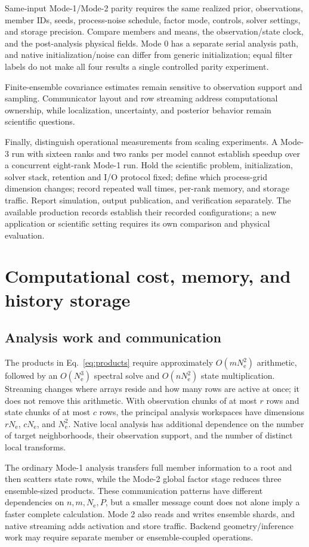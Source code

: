 \documentclass[11pt,a4paper]{article}
\newcommand{\Ne}{N_{\mathrm e}}
\begin{document}
Same-input Mode-1/Mode-2 parity requires the same realized prior, observations, member IDs, seeds, process-noise schedule, factor mode, controls, solver settings, and storage precision. Compare members and means, the observation/state clock, and the post-analysis physical fields. Mode 0 has a separate serial analysis path, and native initialization/noise can differ from generic initialization; equal filter labels do not make all four results a single controlled parity experiment.

Finite-ensemble covariance estimates remain sensitive to observation support and sampling. Communicator layout and row streaming address computational ownership, while localization, uncertainty, and posterior behavior remain scientific questions.

Finally, distinguish operational measurements from scaling experiments. A Mode-3 run with sixteen ranks and two ranks per model cannot establish speedup over a concurrent eight-rank Mode-1 run. Hold the scientific problem, initialization, solver stack, retention and I/O protocol fixed; define which process-grid dimension changes; record repeated wall times, per-rank memory, and storage traffic. Report simulation, output publication, and verification separately. The available production records establish their recorded configurations; a new application or scientific setting requires its own comparison and physical evaluation.


\section{Computational cost, memory, and history storage}
\subsection{Analysis work and communication}
The products in Eq.~\ref{eq:products} require approximately \(O(m\Ne^2)\) arithmetic, followed by an \(O(\Ne^3)\) spectral solve and \(O(n\Ne^2)\) state multiplication. Streaming changes where arrays reside and how many rows are active at once; it does not remove this arithmetic. With observation chunks of at most \(r\) rows and state chunks of at most \(c\) rows, the principal analysis workspaces have dimensions \(r\Ne\), \(c\Ne\), and \(\Ne^2\). Native local analysis has additional dependence on the number of target neighborhoods, their observation support, and the number of distinct local transforms.

The ordinary Mode-1 analysis transfers full member information to a root and then scatters state rows, while the Mode-2 global factor stage reduces three ensemble-sized products. These communication patterns have different dependencies on \(n,m,\Ne,P\), but a smaller message count does not alone imply a faster complete calculation. Mode 2 also reads and writes ensemble shards, and native streaming adds activation and store traffic. Backend geometry/inference work may require separate member or ensemble-coupled operations.
\end{document}
